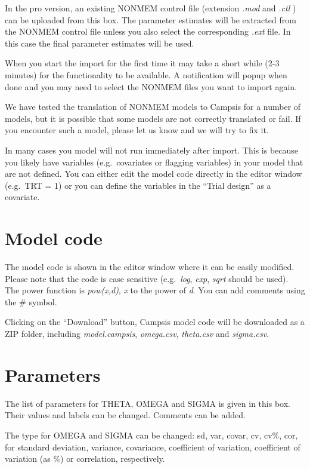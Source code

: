 \documentclass[
]{book}
\begin{document}
In the pro version, an existing NONMEM control file (extension \emph{.mod} and \emph{.ctl} ) can be uploaded from this box. The parameter estimates will be extracted from the NONMEM control file unless you also select the corresponding \emph{.ext} file. In this case the final parameter estimates will be used.

When you start the import for the first time it may take a short while (2-3 minutes) for the functionality to be available. A notification will popup when done and you may need to select the NONMEM files you want to import again.

We have tested the translation of NONMEM models to Campsis for a number of models, but it is possible that some models are not correctly translated or fail. If you encounter such a model, please let us know and we will try to fix it.

In many cases you model will not run immediately after import. This is because you likely have variables (e.g.~covariates or flagging variables) in your model that are not defined.
You can either edit the model code directly in the editor window (e.g.~TRT = 1) or you can define the variables in the ``Trial design'' as a covariate.

\section{Model code}\label{model-code}

The model code is shown in the editor window where it can be easily modified. Please note that the code is case sensitive (e.g.~\emph{log}, \emph{exp}, \emph{sqrt} should be used). The power function is \emph{pow(x,d)}, \emph{x} to the power of \emph{d}.
You can add comments using the \# symbol.

Clicking on the ``Download'' button, Campsis model code will be downloaded as a ZIP folder, including \emph{model.campsis}, \emph{omega.csv}, \emph{theta.csv} and \emph{sigma.csv}.

\section{Parameters}\label{parameters}

The list of parameters for THETA, OMEGA and SIGMA is given in this box. Their values and labels can be changed. Comments can be added.

The type for OMEGA and SIGMA can be changed: sd, var, covar, cv, cv\%, cor, for standard deviation, variance, covariance, coefficient of variation, coefficient of variation (as \%) or correlation, respectively.
\end{document}
